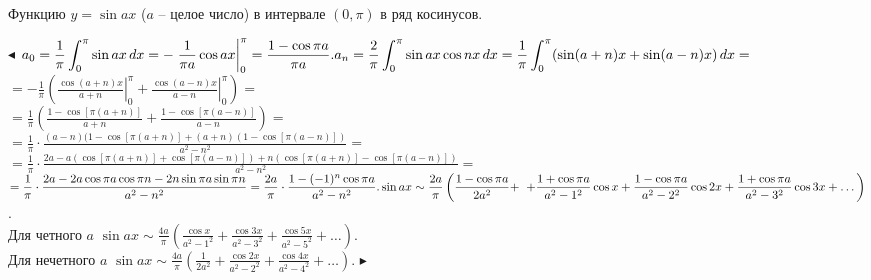 \documentclass[a5paper,10pt]{article}
\begin{document}
\medskip
{} Функцию $y=\sin ax$ ($a$ -- целое число) в
интервале $(0,\pi)$ в ряд косинусов.

\smallskip
\noindent $\blacktriangleleft$
$\displaystyle a_0=\frac{1}{\pi}\int_0^{\pi}\sin ax\,dx=
-\left.\frac{1}{\pi a}\cos ax\right|_0^{\pi}=
\frac{1-\cos\pi a}{\pi a}.\\
a_n=\frac{2}{\pi}\int_0^{\pi}\sin ax\cos nx\,dx=
\frac{1}{\pi}\int_0^{\pi}(\sin (a+n)x+\sin (a-n)x)\,dx=$\\
$\displaystyle =-\frac{1}{\pi}\left(\left.\frac{\cos (a+n)x}{a+n}\right|_0^{\pi}+
\left.\frac{\cos (a-n)x}{a-n}\right|_0^{\pi}\right)=$\\
$\displaystyle =\frac{1}{\pi}\left(\frac{1-\cos[\pi(a+n)]}{a+n}+
\frac{1-\cos[\pi(a-n)]}{a-n}\right)=$\\
$\displaystyle =\frac{1}{\pi}\cdot\frac{(a-n)(1-\cos[\pi(a+n)]+
(a+n)(1-\cos[\pi(a-n)])}{a^2-n^2}=$\\
$\displaystyle =\frac{1}{\pi}\cdot\frac{2a-a(\cos[\pi(a+n)]+\cos[\pi(a-n)])+
n(\cos[\pi(a+n)]-\cos[\pi(a-n)])}{a^2-n^2}=$\\
$\displaystyle =\frac{1}{\pi}\cdot\frac{2a-2a\cos\pi a\cos\pi n-2n\sin\pi a\sin\pi n}{a^2-n^2}=
\frac{2a}{\pi}\cdot\frac{1-(-1)^n\cos\pi a}{a^2-n^2}.\\
\sin ax\sim \frac{2a}{\pi}\left(\frac{1-\cos\pi a}{2a^2}+\right.\\
\left.+\frac{1+\cos\pi a}{a^2-1^2}\cos x+
\frac{1-\cos\pi a}{a^2-2^2}\cos 2x+
\frac{1+\cos\pi a}{a^2-3^2}\cos 3x+\dots\right)$.\\
Для четного $a$ $\displaystyle \sin ax\sim \frac{4a}{\pi}\left(\frac{\cos x}{a^2-1^2}+
\frac{\cos 3x}{a^2-3^2}+\frac{\cos 5x}{a^2-5^2}+\dots\right)$.\\
Для нечетного $a$ $\displaystyle \sin ax\sim \frac{4a}{\pi}\left(\frac{1}{2a^2}+
\frac{\cos 2x}{a^2-2^2}+\frac{\cos 4x}{a^2-4^2}+\dots\right)$.
$\blacktriangleright$

\bigskip
{}
\end{document}
